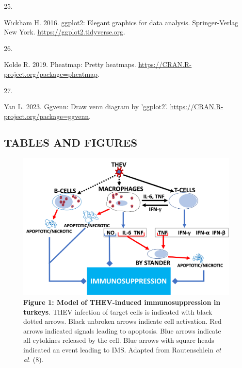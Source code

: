 \documentclass[
]{article}
\newlength{\cslhangindent}
\newlength{\csllabelwidth}
\newenvironment{CSLReferences}[2] %
 {\begin{list}{}{%
  \setlength{\itemindent}{0pt}
  \setlength{\leftmargin}{0pt}
  \setlength{\parsep}{0pt}
  \ifodd #1
   \setlength{\leftmargin}{\cslhangindent}
   \setlength{\itemindent}{-1\cslhangindent}
  \fi
  \setlength{\itemsep}{#2\baselineskip}}}
 {\end{list}}
\newcommand{\CSLLeftMargin}[1]{\parbox[t]{\csllabelwidth}{\strut#1\strut}}
\newcommand{\CSLRightInline}[1]{\parbox[t]{\linewidth - \csllabelwidth}{\strut#1\strut}}
\begin{document}
\begin{CSLReferences}{0}{1}
\CSLLeftMargin{25. }%
\CSLRightInline{Wickham H. 2016. ggplot2: Elegant graphics for data
analysis. Springer-Verlag New York.
\url{https://ggplot2.tidyverse.org}.}

\CSLLeftMargin{26. }%
\CSLRightInline{Kolde R. 2019. Pheatmap: Pretty heatmaps.
\url{https://CRAN.R-project.org/package=pheatmap}.}

\CSLLeftMargin{27. }%
\CSLRightInline{Yan L. 2023. Ggvenn: Draw venn diagram by 'ggplot2'.
\url{https://CRAN.R-project.org/package=ggvenn}.}

\end{CSLReferences}

\setlength{\parindent}{0in}
\setlength{\leftskip}{0in}
\newpage

\newpage

\subsection{TABLES AND FIGURES}\label{tables-and-figures}

\begin{figure}
\centering
\includegraphics{results/imss_model.png}
\caption{\textbf{Figure 1: Model of THEV-induced immunosuppression in
turkeys}. THEV infection of target cells is indicated with black dotted
arrows. Black unbroken arrows indicate cell activation. Red arrows
indicated signals leading to apoptosis. Blue arrows indicate all
cytokines released by the cell. Blue arrows with square heads indicated
an event leading to IMS. Adapted from Rautenschlein \emph{et al.} (8).}
\end{figure}
\end{document}
